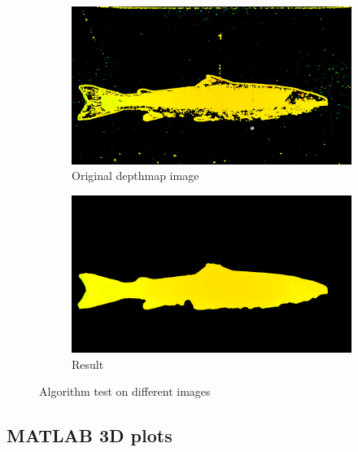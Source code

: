 \begin{figure}[H]
    \medskip
    \begin{subfigure}{0.49\textwidth}
        \includegraphics[width=\linewidth]{images/results/algorithm_test/original_87}
        \caption{Original depthmap image} 
        \label{fig:original_depthmap_87}
    \end{subfigure}\hspace*{\fill}
    \begin{subfigure}{0.49\textwidth}
        \includegraphics[width=\linewidth]{images/results/algorithm_test/median_filter_87}
        \caption{Result} 
        \label{fig:result_87}
    \end{subfigure}
    
    \caption{Algorithm test on different images} 
    \label{fig:algorithm_test}
\end{figure}





\subsection{MATLAB 3D plots}

